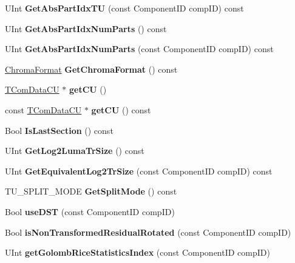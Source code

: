 \begin{DoxyCompactItemize}
U\+Int {\bfseries Get\+Abs\+Part\+Idx\+TU} (const Component\+ID comp\+ID) const
\item 
\mbox{\label{class_t_com_t_u_af9bfe1f9b2e8c3320eccbf4af9b005df}} 
U\+Int {\bfseries Get\+Abs\+Part\+Idx\+Num\+Parts} () const
\item 
\mbox{\label{class_t_com_t_u_a5dabaad5ca4f2695a67a6604469115e6}} 
U\+Int {\bfseries Get\+Abs\+Part\+Idx\+Num\+Parts} (const Component\+ID comp\+ID) const
\item 
\mbox{\label{class_t_com_t_u_a001d8db7b7a2264b1c49a72e38b0e394}} 
\hyperlink{_type_def_8h_a4a6c51c10f2eb04abc7209db7caff39f}{Chroma\+Format} {\bfseries Get\+Chroma\+Format} () const
\item 
\mbox{\label{class_t_com_t_u_aeacf570de21e3d1d32881deaf3a4f475}} 
\hyperlink{class_t_com_data_c_u}{T\+Com\+Data\+CU} $\ast$ {\bfseries get\+CU} ()
\item 
\mbox{\label{class_t_com_t_u_a3c16c2bb21d162f20766d016124090d2}} 
const \hyperlink{class_t_com_data_c_u}{T\+Com\+Data\+CU} $\ast$ {\bfseries get\+CU} () const
\item 
\mbox{\label{class_t_com_t_u_a7e0e0125c6e485312b3808a654aec607}} 
Bool {\bfseries Is\+Last\+Section} () const
\item 
\mbox{\label{class_t_com_t_u_a7fab21576a769740ed5245d24d078db2}} 
U\+Int {\bfseries Get\+Log2\+Luma\+Tr\+Size} () const
\item 
\mbox{\label{class_t_com_t_u_a2d84c979942eb4af0a27e57c6639baa8}} 
U\+Int {\bfseries Get\+Equivalent\+Log2\+Tr\+Size} (const Component\+ID comp\+ID) const
\item 
\mbox{\label{class_t_com_t_u_af7b587287ab328586068141db580c86c}} 
T\+U\+\_\+\+S\+P\+L\+I\+T\+\_\+\+M\+O\+DE {\bfseries Get\+Split\+Mode} () const
\item 
\mbox{\label{class_t_com_t_u_ad2c778a2e2f7a17a99c20a6790fce90d}} 
Bool {\bfseries use\+D\+ST} (const Component\+ID comp\+ID)
\item 
\mbox{\label{class_t_com_t_u_a2cadb10f5a948fac113d593822858c90}} 
Bool {\bfseries is\+Non\+Transformed\+Residual\+Rotated} (const Component\+ID comp\+ID)
\item 
\mbox{\label{class_t_com_t_u_a203dd0f5acb7546b42f754324d4efaad}} 
U\+Int {\bfseries get\+Golomb\+Rice\+Statistics\+Index} (const Component\+ID comp\+ID)
\end{DoxyCompactItemize}
